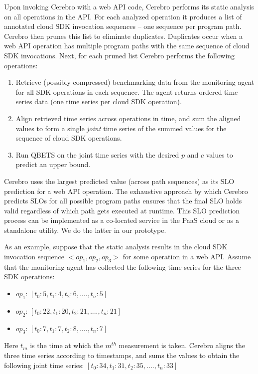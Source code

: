 Upon invoking Cerebro with a web API code, Cerebro
performs its static analysis on all operations in the API. For each
analyzed operation it produces a list of annotated cloud SDK invocation sequences --
one sequence per program path. Cerebro then prunes this list to eliminate duplicates.
Duplicates occur when a web API operation has
multiple program paths with the same sequence of cloud SDK invocations.
Next, for each pruned list Cerebro performs the following operations:
\begin{enumerate}
\item Retrieve (possibly compressed) benchmarking data from the monitoring agent 
for all SDK operations in each sequence. The agent returns
ordered time series data (one time series per cloud SDK operation).
\item Align retrieved time series across operations in time, and sum the aligned
values
to form a single \textit{joint} time series of the summed values for the 
sequence of cloud SDK operations.
\item Run QBETS on the joint time series with the 
desired $p$ and $c$ values to predict an upper bound. 
\end{enumerate}
Cerebro uses the largest predicted value (across path sequences) 
as its SLO prediction for a web API operation. The exhaustive approach by 
which Cerebro predicts SLOs for all possible program paths ensures that
the final SLO holds valid regardless of which path gets executed at runtime.
This SLO prediction process can be implemented
as a co-located service in the PaaS cloud or as a standalone utility.  We do 
the latter in our prototype.

As an example, suppose that the static analysis results in the
cloud SDK invocation sequence $<op_{1},op_{2},op_{3}>$ for
some operation in a web API. 
Assume that the monitoring agent has collected the following
time series for the three SDK operations:
\begin{itemize}
\item $op_{1}$: $[t_{0}: 5, t_{1}: 4, t_{2}: 6, ...., t_{n}: 5]$
\item $op_{2}$: $[t_{0}: 22, t_{1}: 20, t_{2}: 21, ...., t_{n}: 21]$
\item $op_{3}$: $[t_{0}: 7, t_{1}: 7, t_{2}: 8, ...., t_{n}: 7]$
\end{itemize}

Here $t_{m}$ is the time at which the $m^{th}$ measurement is taken.
Cerebro aligns the three time series according to timestamps, 
and sums the values
to obtain the following joint time series:
$[t_{0}: 34, t_{1}: 31, t_{2}: 35, ...., t_{n}: 33]$

